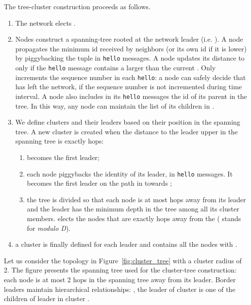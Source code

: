 \documentclass[twoside]{article}
\begin{document}
The tree-cluster construction proceeds as follows.
\begin{enumerate}
\item The network elects .








\item Nodes construct a spanning-tree rooted at the network leader
  (i.e. ). A node propagates the minimum id received by
  neighbors (or its own id if it is lower) by piggybacking the tuple
   in \texttt{hello} messages. A node
  updates its distance to  only if the \texttt{hello}
  message contains a larger  than the current
  . Only  increments the
  sequence number in each \texttt{hello}: a node can safely decide that  has
  left the network, if the sequence number is not incremented during
   time interval.  A node also includes in its
  \texttt{hello} messages the id of its parent in the tree. In this
  way, any node can maintain the list of its children in .

\item We define clusters and their leaders based on their position in
  the spanning tree. A new cluster is created when the distance to the
  leader upper in the spanning tree is exactly  hops:
	\begin{enumerate}
		\item  becomes the first leader; 
		\item each node piggybacks the identity of its leader,
                   in \texttt{hello} messages. It becomes
                  the first leader on the path in  towards
                  ;
		\item the tree is divided so that each node is at most
                   hops away from its leader and the leader has the
                  minimum depth in the tree among all its cluster
                  members. \potatoes elects the nodes that are
                  exactly  hops away from the
                   ( stands for \emph{modulo D}).
	\end{enumerate}
      \item a cluster is finally defined for each leader
         and contains all the nodes with
        .
\end{enumerate}

Let us consider the topology in Figure~\ref{fig:cluster_tree} with a
cluster radius of 2. The figure presents the spanning tree used for
the cluster-tree construction: each node is at most 2 hops in the
spanning tree away from its leader. Border leaders maintain hierarchical
relationships: , the leader of cluster  is one of the children
of leader  in cluster .
\end{document}
